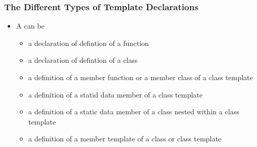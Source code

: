 \documentclass[10pt]{article}
\begin{document}
\subsubsection{The Different Types of Template Declarations}
\begin{itemize}
	\item A \textbf{} can be 
		\begin{itemize}
			\item a declaration of defintion of a function
			\item a declaration of defintion of a class
			\item a definition of a member function or a member class of a class template
			\item a definition of a statid data member of a class template
			\item a definition of a static data member of a class nested within a class template
			\item a definition of a member template of a class or class template
		\end{itemize}
\end{itemize}

\newpage
\end{document}
